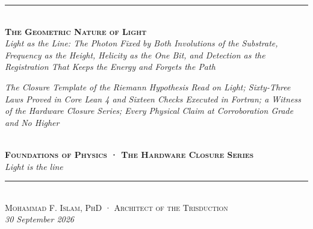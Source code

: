 \documentclass[10pt]{article}
\begin{document}
\begin{center}
{\color{accent}\rule{0.6\textwidth}{0.8pt}}\\[10pt]
{\bfseries\scshape\fontsize{19}{23}\selectfont The Geometric Nature of
Light}\\[7pt]
{\itshape\large Light as the Line: The Photon Fixed by Both Involutions
of the Substrate, Frequency as the Height, Helicity as the One Bit, and
Detection as the Registration That Keeps the Energy and Forgets the
Path}\\[6pt]
\parbox{0.86\textwidth}{\centering\small\itshape\color{faint} The
Closure Template of the Riemann Hypothesis Read on Light; Sixty-Three
Laws Proved in Core Lean 4 and Sixteen Checks Executed in Fortran; a
Witness of the Hardware Closure Series; Every Physical Claim at
Corroboration Grade and No Higher}\\[8pt]
{\footnotesize\color{accent}\scshape\bfseries Foundations of Physics ·
The Hardware Closure Series}\\[3pt]
{\itshape\color{deep}\small Light is the line}\\[9pt]
{\color{accent}\rule{0.6\textwidth}{0.8pt}}\\[10pt]
{\scshape Mohammad F. Islam, PhD · Architect of the Trisduction}\\[2pt]

{\itshape\color{faint}\small 30 September 2026}\\[12pt]
\end{center}
\noindent{\color{accent}\rule{\textwidth}{0.6pt}}\\[2pt]
\end{document}

